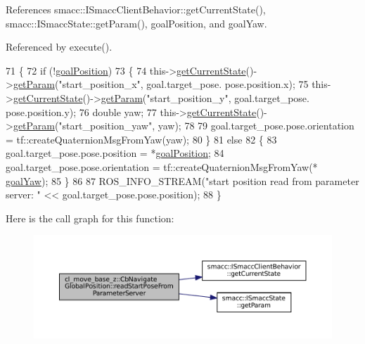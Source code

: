 References smacc\+::\+I\+Smacc\+Client\+Behavior\+::get\+Current\+State(), smacc\+::\+I\+Smacc\+State\+::get\+Param(), goal\+Position, and goal\+Yaw.



Referenced by execute().


\begin{DoxyCode}
71     \{
72         \textcolor{keywordflow}{if} (!\hyperlink{classcl__move__base__z_1_1CbNavigateGlobalPosition_a51a0266fd9a63e99f26e88933529c559}{goalPosition})
73         \{
74             this->\hyperlink{classsmacc_1_1ISmaccClientBehavior_a34fde34e48fa13db622ee60d8374d0b8}{getCurrentState}()->\hyperlink{classsmacc_1_1ISmaccState_abbb3a24b912c6e8de28f7b86123b6357}{getParam}(\textcolor{stringliteral}{"start\_position\_x"}, goal.target\_pose.
      pose.position.x);
75             this->\hyperlink{classsmacc_1_1ISmaccClientBehavior_a34fde34e48fa13db622ee60d8374d0b8}{getCurrentState}()->\hyperlink{classsmacc_1_1ISmaccState_abbb3a24b912c6e8de28f7b86123b6357}{getParam}(\textcolor{stringliteral}{"start\_position\_y"}, goal.target\_pose.
      pose.position.y);
76             \textcolor{keywordtype}{double} yaw;
77             this->\hyperlink{classsmacc_1_1ISmaccClientBehavior_a34fde34e48fa13db622ee60d8374d0b8}{getCurrentState}()->\hyperlink{classsmacc_1_1ISmaccState_abbb3a24b912c6e8de28f7b86123b6357}{getParam}(\textcolor{stringliteral}{"start\_position\_yaw"}, yaw);
78 
79             goal.target\_pose.pose.orientation = tf::createQuaternionMsgFromYaw(yaw);
80         \}
81         \textcolor{keywordflow}{else}
82         \{
83             goal.target\_pose.pose.position = *\hyperlink{classcl__move__base__z_1_1CbNavigateGlobalPosition_a51a0266fd9a63e99f26e88933529c559}{goalPosition};
84             goal.target\_pose.pose.orientation = tf::createQuaternionMsgFromYaw(*
      \hyperlink{classcl__move__base__z_1_1CbNavigateGlobalPosition_a839900de7f664b27c9be189fadbaa003}{goalYaw});
85         \}
86 
87         ROS\_INFO\_STREAM(\textcolor{stringliteral}{"start position read from parameter server: "} << goal.target\_pose.pose.position);
88     \}
\end{DoxyCode}
Here is the call graph for this function\+:
\nopagebreak
\begin{figure}[H]
\begin{center}
\leavevmode
\includegraphics[width=350pt]{classcl__move__base__z_1_1CbNavigateGlobalPosition_a868b25f238e3781c9a2e44b4e1502fcc_cgraph}
\end{center}
\end{figure}

